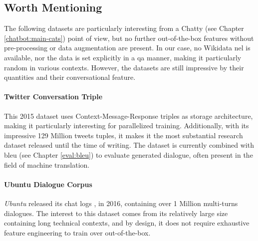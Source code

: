 \subsection{Worth Mentioning}
The following datasets are particularly interesting from a Chatty (see Chapter \ref{chatbot:main-cats}) point of view, but no further out-of-the-box features without pre-processing or data augmentation are present. In our case, no Wikidata \gls{nel}  is available, nor the data is set explicitly in a \gls{qa} manner, making it particularly random in various contexts. However, the datasets are still impressive by their quantities and their conversational feature.

\paragraph{Twitter Conversation Triple}
This 2015 dataset uses Context-Message-Response triples as storage architecture, making it particularly interesting for parallelized training. Additionally, with its impressive 129 Million tweets tuples, it makes it the most substantial research dataset released until the time of writing. The dataset is currently combined with \gls{bleu} (see Chapter \ref{eval:bleu}) to evaluate generated dialogue, often present in the field of machine translation.

\paragraph{Ubuntu Dialogue Corpus}
\textit{Ubuntu} released its chat logs \autocite{paper:journals/corr/LowePSP15}, in 2016, containing over 1 Million multi-turns dialogues. The interest to this dataset comes from its relatively large size containing long technical contexts, and by design, it does not require exhaustive feature engineering to train over out-of-the-box.



